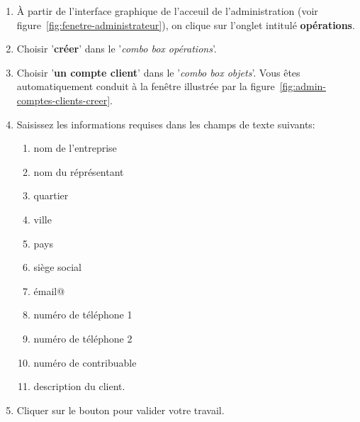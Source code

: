 \begin{enumerate}[1)]
	\item \`A partir de l'interface graphique de l'acceuil de
		l'administration (voir figure~\ref{fig:fenetre-administrateur}),
		on clique sur l'onglet intitul\'e \textbf{op\'erations}. 
		
	\item Choisir '\textbf{cr\'eer}' dans le '\emph{combo box
		op\'erations}'.
		
	\item Choisir '\textbf{un compte client}' dans
		le '\emph{combo box objets}'. Vous \^etes automatiquement
		conduit \`a la fen\^etre illustr\'ee par la
		figure~\ref{fig:admin-comptes-clients-creer}.
		
	\item Saisissez les informations requises dans les champs de texte
		suivants:
		\begin{enumerate}[1)]
			\item nom de l'entreprise \obligatoire
			\item nom du r\'epr\'esentant \obligatoire
			\item quartier
			\item ville 
			\item pays
			\item si\`ege social 
			\item \'email@ 
			\item num\'ero de t\'el\'ephone 1 
			\item num\'ero de t\'el\'ephone 2
			\item num\'ero de contribuable 
			\item description du client.			
		\end{enumerate}
		
	\item Cliquer sur le bouton  pour
		valider votre travail.		
\end{enumerate}


\newpage
{}\label{sec:administration-comptes-clients-lister}


